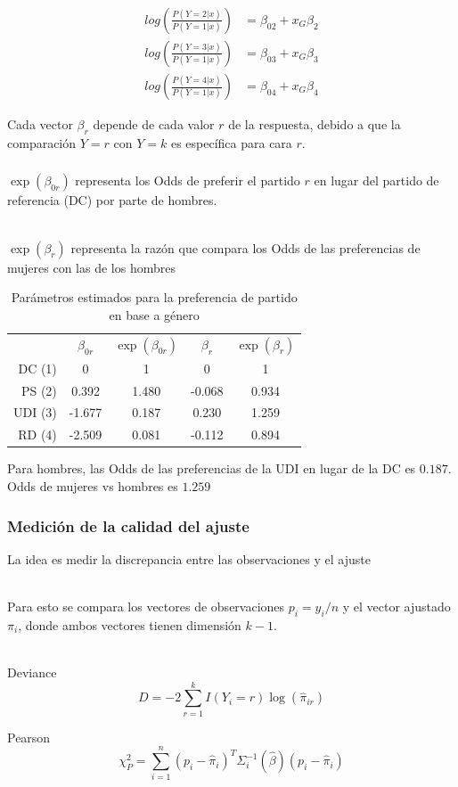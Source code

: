 \documentclass[]{beamer}
\begin{document}
\begin{frame}
	\frametitle{}

	\begin{align*}
		log\left(\frac{P(Y=2|x)}{P(Y=1|x)}\right) & =\beta_{02} + x_G\beta_2 \\ 
		log\left(\frac{P(Y=3|x)}{P(Y=1|x)}\right) & =\beta_{03} + x_G\beta_3 \\ 
		log\left(\frac{P(Y=4|x)}{P(Y=1|x)}\right) & =\beta_{04} + x_G\beta_4 
	\end{align*}
	
	Cada vector $\beta_r$ depende de cada valor $r$ de la respuesta, debido a que la comparación
	$Y=r$ con $Y=k$ es específica para cara $r$.

\end{frame}

\begin{frame}
	\frametitle{}

	$\exp(\beta_{0r})$ representa los Odds de preferir el partido $r$ en lugar del partido 
	de referencia (DC) por parte de hombres.\\~\  

	$\exp(\beta_{r})$ representa la razón que compara los Odds de las preferencias de mujeres 
	con las de los hombres

	\begin{table}[]
		\begin{tabular}{rcccc}
			& & & & \\ \hline 
			& $\beta_{0r}$ & $\exp(\beta_{0r})$ & $\beta_{r}$ & $\exp(\beta_{r})$\\ \hline 
		DC (1)  & 0      & 1     & 0      & 1     \\
		PS (2)  & 0.392  & 1.480 & -0.068 & 0.934 \\
		UDI (3) & -1.677 & 0.187 & 0.230  & 1.259 \\
		RD (4)  & -2.509 & 0.081 & -0.112 & 0.894 \\ \hline 
		\end{tabular}
		\caption{Parámetros estimados para la preferencia de partido en base a género}
	\end{table}

	Para hombres, las Odds de las preferencias de la UDI en lugar de la DC es $0.187$.
	Odds de mujeres vs hombres es $1.259$
\end{frame}

\begin{frame}
	\frametitle{Medición de la calidad del ajuste}

	La idea es medir la discrepancia entre las observaciones y el ajuste\\~\  

	Para esto se compara los vectores de observaciones $p_i=y_i/n$ y el vector ajustado $\pi_i$,
	 donde ambos vectores tienen dimensión $k-1$.\\~\  

	Deviance 
	$$D=-2\sum_{r=1}^{k}I(Y_i=r)\log(\widehat{\pi}_{ir})$$

	Pearson 
	$$\chi_{P}^2=\sum_{i=1}^{n}(p_i-\widehat{\pi}_i)^T\Sigma_i^{-1}(\widehat{\beta})(p_i-\widehat{\pi}_i)$$
	

\end{frame}
\end{document}
